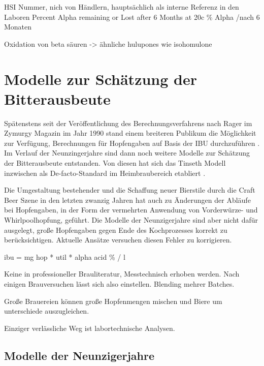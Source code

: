 \documentclass[a4paper,parskip=half]{scrartcl}
\begin{document}
\parencite[104]{Garetz1994} 
HSI Nummer, nich von Händlern, hauptsächlich als interne Referenz
in den Laboren
Percent Alpha remaining or Lost after 6 Months at 20c
\% Alpha /nach 6 Monaten



\parencite[52]{Davidson1997}
Oxidation von beta säuren -> ähnliche hulupones wie isohomulone



\section*{Modelle zur Schätzung der Bitterausbeute}

Spätenstens seit der Veröffentlichung des Berechnungsverfahrens nach
Rager im Zymurgy Magazin im Jahr 1990 stand einem breiteren
Publikum die Möglichkeit zur Verfügung, Berechnungen für Hopfengaben auf
Basis der IBU
durchzuführen \parencite[59]{Hall1997}. Im Verlauf der Neunzingerjahre
sind dann noch weitere Modelle zur Schätzung der Bitterausbeute entstanden.
Von diesen hat sich das Tinseth Modell inzwischen als De-facto-Standard im
Heimbraubereich etabliert \parencite[185]{Hieronymus2012}.

Die Umgestaltung bestehender und die Schaffung neuer Bierstile
durch die Craft Beer Szene in den letzten zwanzig Jahren hat auch zu Änderungen
der Abläufe bei Hopfengaben, in der Form der vermehrten Anwendung von Vorderwürze-
und Whirlpoolhopfung, geführt. Die Modelle der Neunzigerjahre sind aber
nicht dafür ausgelegt, große Hopfengaben gegen Ende des Kochprozesses korrekt
zu berücksichtigen. Aktuelle Ansätze versuchen diesen Fehler zu korrigieren.
\parencite[39]{Novotny2018}


\parencite[51]{Holle2010}
ibu = mg hop * util * alpha acid \% / l

\parencite[127]{Garetz1994} 
Keine in professioneller Brauliteratur, Messtechnisch erhoben
werden. Nach einigen Brauversuchen lässt sich also einstellen.
Blending mehrer Batches.

\parencite[76]{Daniels1996}
Große Brauereien können große Hopfenmengen mischen und
Biere um unterschiede auszugleichen.

\parencite[51]{Holle2010}
Einziger verlässliche Weg ist labortechnische Analysen.




\subsection*{Modelle der Neunzigerjahre}
\end{document}
